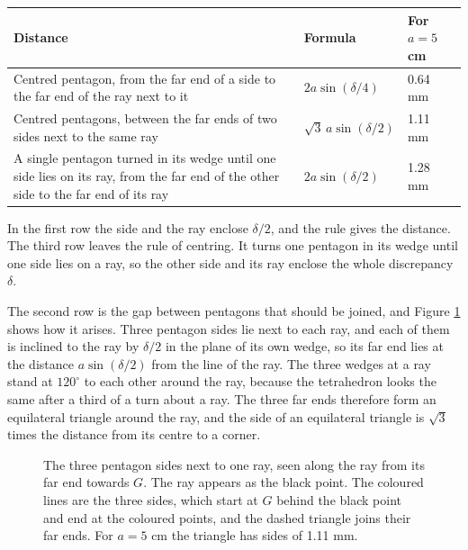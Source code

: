 \documentclass[a4paper,12pt]{article}
\begin{document}
\begin{center}
\begin{tabular}{p{8.6cm}ll}
Distance & Formula & For \( a = 5 \) cm \\
\hline
Centred pentagon, from the far end of a side to the far end of the ray next to it & \( 2a\sin(\delta/4) \) & 0.64 mm \\
Centred pentagons, between the far ends of two sides next to the same ray & \( \sqrt{3}\,a\sin(\delta/2) \) & 1.11 mm \\
A single pentagon turned in its wedge until one side lies on its ray, from the far end of the other side to the far end of its ray & \( 2a\sin(\delta/2) \) & 1.28 mm \\
\end{tabular}
\end{center}

\noindent
In the first row the side and the ray enclose \( \delta/2 \), and the rule gives the distance. The third row leaves the rule of centring. It turns one pentagon in its wedge until one side lies on a ray, so the other side and its ray enclose the whole discrepancy \( \delta \).

The second row is the gap between pentagons that should be joined, and Figure \ref{fig:endon} shows how it arises. Three pentagon sides lie next to each ray, and each of them is inclined to the ray by \( \delta/2 \) in the plane of its own wedge, so its far end lies at the distance \( a\sin(\delta/2) \) from the line of the ray. The three wedges at a ray stand at \( 120^\circ \) to each other around the ray, because the tetrahedron looks the same after a third of a turn about a ray. The three far ends therefore form an equilateral triangle around the ray, and the side of an equilateral triangle is \( \sqrt{3} \) times the distance from its centre to a corner.

\begin{figure}[h]
\centering
{}
\caption{The three pentagon sides next to one ray, seen along the ray from its far end towards \( G \). The ray appears as the black point. The coloured lines are the three sides, which start at \( G \) behind the black point and end at the coloured points, and the dashed triangle joins their far ends. For \( a = 5 \) cm the triangle has sides of 1.11 mm.}
\label{fig:endon}
\end{figure}
\end{document}
